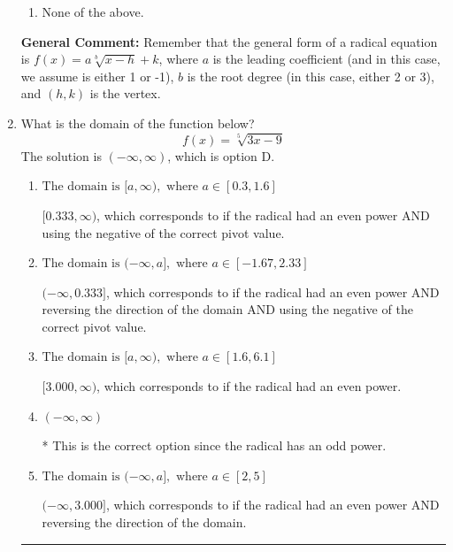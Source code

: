 \documentclass{extbook}[14pt]
\newcommand{\litem}[1]{\item #1

\rule{\textwidth}{0.4pt}}
\begin{document}
\begin{enumerate}
{\begin{enumerate}[label=\Alph*.]
\item None of the above.\end{enumerate}
\textbf{General Comment:} Remember that the general form of a radical equation is $ f(x) = a \sqrt[b]{x - h} + k $, where $a$ is the leading coefficient (and in this case, we assume is either 1 or -1), $b$ is the root degree (in this case, either 2 or 3), and $(h, k)$ is the vertex.
}
\litem{
What is the domain of the function below?
\[ f(x) = \sqrt[5]{3 x - 9} \]The solution is \( (-\infty, \infty) \), which is option D.\begin{enumerate}[label=\Alph*.]
\item \( \text{The domain is } [a, \infty), \text{   where } a \in [0.3, 1.6] \)

$[0.333, \infty)$, which corresponds to if the radical had an even power AND using the negative of the correct pivot value.
\item \( \text{The domain is } (-\infty, a], \text{   where } a \in [-1.67, 2.33] \)

$(-\infty, 0.333]$, which corresponds to if the radical had an even power AND reversing the direction of the domain AND using the negative of the correct pivot value.
\item \( \text{The domain is } [a, \infty), \text{   where } a \in [1.6, 6.1] \)

$[3.000, \infty)$, which corresponds to if the radical had an even power.
\item \( (-\infty, \infty) \)

* This is the correct option since the radical has an odd power.
\item \( \text{The domain is } (-\infty, a], \text{   where } a \in [2, 5] \)

$(-\infty, 3.000]$, which corresponds to if the radical had an even power AND reversing the direction of the domain.
\end{enumerate}

}
\end{enumerate}
\end{document}
